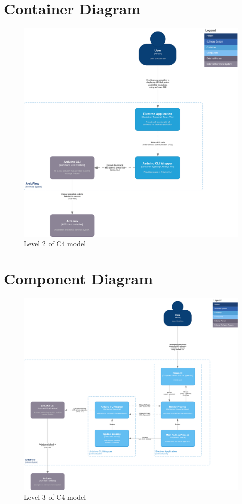 \documentclass[a4paper, 11pt]{article}
\begin{document}
\section{Container Diagram}
\begin{figure}[H]
    \includegraphics[width=\linewidth]{C4model/ArduFlow c4-2.png}
    \caption{Level 2 of C4 model}
    \label{fig:Level 2 of C4 model}
\end{figure}


\section{Component Diagram}
\begin{figure}[H]
    \includegraphics[width=\linewidth]{C4model/ArduFlow c4-3.png}
    \caption{Level 3 of C4 model}
    \label{fig:Level 3 of C4 model}
\end{figure}
\end{document}

